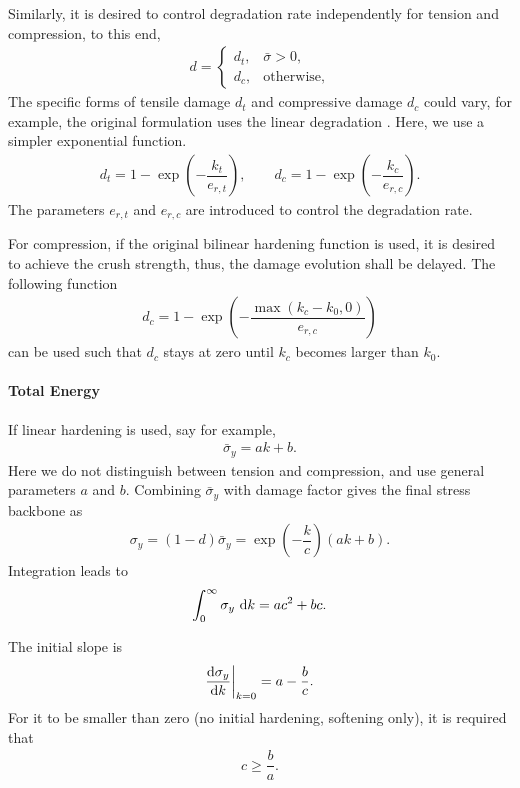 Similarly, it is desired to control degradation rate independently for tension and compression, to this end,
\begin{gather}
d=\left\{
\begin{array}{ll}
d_t,&\bar{\sigma}>0,\\
d_c,&\text{otherwise},
\end{array}
\right.
\end{gather}
The specific forms of tensile damage $d_t$ and compressive damage $d_c$ could vary, for example, the original formulation \cite{Kenawy2020} uses the linear degradation \cite{Grassl2013}. Here, we use a simpler exponential function.
\begin{gather}
d_t=1-\exp\left(-\dfrac{k_t}{e_{r,t}}\right),\qquad
d_c=1-\exp\left(-\dfrac{k_c}{e_{r,c}}\right).
\end{gather}
The parameters $e_{r,t}$ and $e_{r,c}$ are introduced to control the degradation rate.

For compression, if the original bilinear hardening function  is used, it is desired to achieve the crush strength, thus, the damage evolution shall be delayed. The following function
\begin{gather*}
d_c=1-\exp\left(-\dfrac{\max\left(k_c-k_0,0\right)}{e_{r,c}}\right)
\end{gather*}
can be used such that $d_c$ stays at zero until $k_c$ becomes larger than $k_0$.
\paragraph{Total Energy}
If linear hardening is used, say for example,
\begin{gather}
\bar{\sigma}_y=ak+b.
\end{gather}
Here we do not distinguish between tension and compression, and use general parameters $a$ and $b$. Combining $\bar{\sigma}_y$ with damage factor gives the final stress backbone as
\begin{gather}
\sigma_y=\left(1-d\right)\bar{\sigma}_y=\exp\left(-\dfrac{k}{c}\right)\left(ak+b\right).
\end{gather}
Integration leads to
\begin{gather}
\int_{0}^{\infty}\sigma_y~\mathrm{d}k=ac^2+bc.
\end{gather}

The initial slope is
\begin{gather}
\dfrac{\mathrm{d}\sigma_y}{\mathrm{d}k}\bigg|_{k=0}=a-\dfrac{b}{c}.
\end{gather}
For it to be smaller than zero (no initial hardening, softening only), it is required that
\begin{gather}
c\geqslant\dfrac{b}{a}.
\end{gather}

